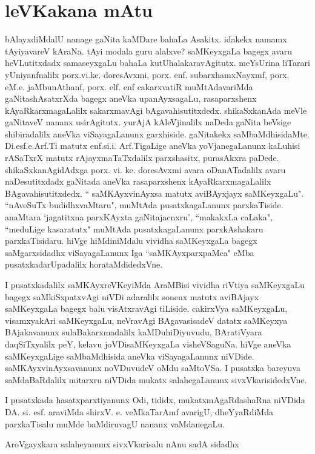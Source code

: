 \chapter{leVKakana mAtu}

bAlayxdiMdalU nanage gaNita kaMDare bahaLa Asakitx. idakekx namamx tAyiyavareV kAraNa. tAyi modala 
guru alalxve? saMKeyxgaLa bagegx avaru heVLutitxdadx samaseyxgaLu bahaLa kutUhalakaravAgitutx. 
meYsUrina liTarari yUniyanfnalilx porx.vi.ke. doresAvxmi, porx. enf. subarxhamxNayxmf, porx. eM.e. 
jaMbunAthanf, porx. elf. enf cakarxvatiR muMtAdavariMda gaNitashAsatxrXda bagegx aneVka upanAyxsagaLu, 
rasaparxshenx kAyaR\-karxmagaLalilx sakarxmavAgi bAgavahisutitxdedx. shikaSxkanAda meVle gaNitaveV 
nananx usirAgitutx. yurAjA kAleVjinalilx naDeda gaNita beVsige shibiradalilx aneVka viSayagaLanunx 
garxhiside. gaNitakekx saMbaMdhisidaMte. Di.esf.e.Arf.Ti matutx enf.si.i. Arf.TigaLige aneVka 
yoVjanegaLanunx kaLuhisi rASaTxrX matutx rAjayxmaTaTxdalilx parxshasitx, purasAkxra paDede. shikaSxkanAgidAdxga porx. vi. ke. doresAvxmi avara oDanATadalilx avaru naDesutitxdadx gaNitada aneVka rasaparxshenx kAyaRkarxmagaLalilx BAgavahisutitxdedx. `` saMKAyxvinAyxsa matutx aviBAyxjayx saMKeyxgaLu". ``nAveSuTx budidhxvaMtaru", muMtAda pusatxkagaLanunx parxkaTiside. anaMtara `jagatitxna parxKAyxta gaNitajacnxru', ``makakxLa caLaka", ``meduLige kasaratutx" muMtAda pusatxkagaLanunx parxkAshakaru parxkaTisidaru. hiVge hiMdiniMdalu vividha saMKeyxgaLa bagegx saMgarxsidadhx viSayagaLanunx Iga ``saMKAyxparxpaMca" eMba pusatxkadarUpadalilx horataMdidedxVne. 

I pusatxkadalilx saMKAyxreVKeyiMda AraMBisi vividha riVtiya saMKeyxgaLu bagegx saMkiSxpatxvAgi niVDi adaralilx sonenx matutx aviBAjayx saMKeyxgaLa bagegx balu visAtxravAgi tiLiside. cakirxVya saMKeyxgaLu, visamxyakAri saMKeyxgaLu, neVravAgi BAgavasisadeV datatx saMKeyxya BAjakavanunx sulaBakarxmadalilx kaMDuhiDiyuvudu, BAratiVyara daqSiTxyalilx peY, kelavu joVDisaMKeyxgaLa visheVSaguNa. hiVge aneVka saMKeyxgaLige saMbaMdhisida aneVka viSayagaLanunx niVDide. saMKAyxvinAyxsavanunx noVDuvudeV oMdu saMtoVSa. I pusatxka bareyuva saMdaBaRdalilx mitarxru niVDida mukatx salahegaLanunx sivxVkarisidedxVne.

I pusatxkada hasatxparxtiyanunx Odi, tididx, mukatxmAgaRdashaRna niVDida DA. si. esf. araviMda shirxV. e. veMkaTarAmf avarigU, dheYyaRdiMda parxkaTisalu muMde baMdiruvagU nananx vaMdanegaLu.

AroVgayxkara salaheyanunx sivxVkarisalu nAnu sadA sidadhx
